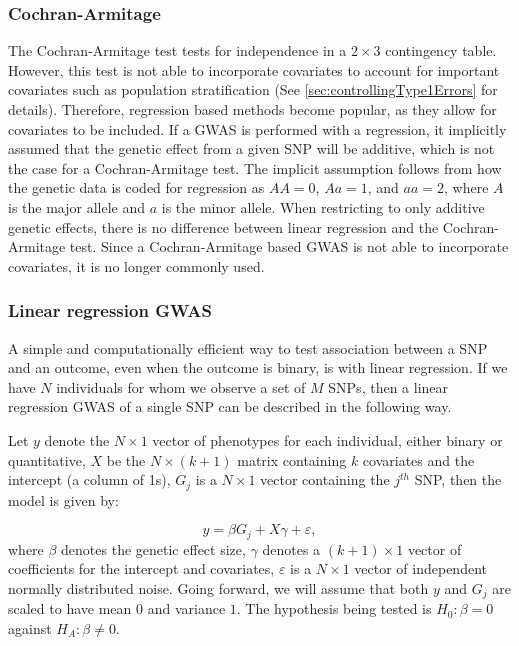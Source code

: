 \subsubsection{Cochran-Armitage}
The Cochran-Armitage test tests for independence in a $ 2\times 3 $ contingency table. However, this test is not able to incorporate covariates to account for important covariates such as population stratification (See \cref{sec:controllingType1Errors} for details). Therefore, regression based methods become popular, as they allow for covariates to be included. If a GWAS is performed with a regression, it implicitly assumed that the genetic effect from a given SNP will be additive, which is not the case for a Cochran-Armitage test. The implicit assumption follows from how the genetic data is coded for regression as $ AA = 0 $, $ Aa = 1 $, and $ aa = 2 $, where $ A $ is the major allele and $ a $ is the minor allele\cite{zeng2015statistical}. When restricting to only additive genetic effects, there is no difference between linear regression and the Cochran-Armitage test\cite{prive2019making}. Since a Cochran-Armitage based GWAS is not able to incorporate covariates, it is no longer commonly used.

\subsubsection{Linear regression GWAS}
A simple and computationally efficient way to test association between a SNP and an outcome, even when the outcome is binary, is with linear regression. If we have $ N $ individuals for whom we observe a set of $ M $ SNPs, then a linear regression GWAS of a single SNP can be described in the following way.

Let $ y $ denote the $ N\times1 $ vector of phenotypes for each individual, either binary or quantitative, $ X $ be the $ N \times (k+1) $ matrix containing $ k $ covariates and the intercept (a column of 1s), $ G_j $ is a $ N\times 1 $ vector containing the $ j^{th} $ SNP, then the model is given by:

\begin{equation}\label{eq:baseGWAS}
y = \beta G_{j} +  X\gamma + \varepsilon,
\end{equation}
where $ \beta $ denotes the genetic effect size, $ \gamma $ denotes a $ (k + 1) \times 1$ vector of coefficients for the intercept and covariates, $ \varepsilon $ is a $ N \times 1 $ vector of independent normally distributed noise. Going forward, we will assume that both $ y $ and $ G_j $ are scaled to have mean $ 0 $ and variance $ 1 $. The hypothesis being tested is $ H_0: \beta = 0 $ against $ H_A: \beta \neq 0 $. 
 
